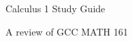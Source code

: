 \documentclass{article}
\begin{document}
\centerline{\sc \large Calculus 1 Study Guide}
\vspace{.5pc}
\centerline{\sc A review of GCC MATH 161}
\vspace{2pc}








\end{document}
